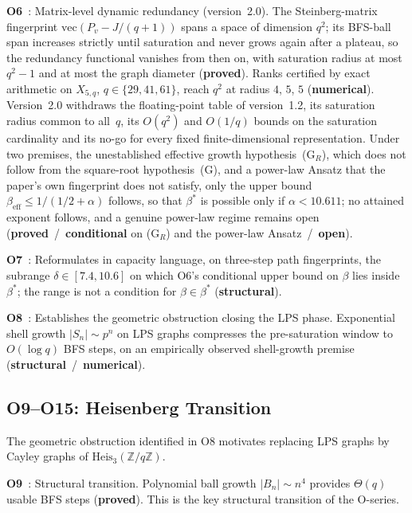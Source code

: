 \documentclass[11pt,a4paper]{article}
\newcommand{\Heis}{\mathrm{Heis}}
\newcommand{\sproved}{\textcolor{cproved}{\textbf{proved}}}
\newcommand{\sstruct}{\textcolor{cstruct}{\textbf{structural}}}
\newcommand{\sopen}{\textcolor{copen}{\textbf{open}}}
\newcommand{\snum}{\textcolor{cnum}{\textbf{numerical}}}
\newcommand{\scond}{\textcolor{ccond}{\textbf{conditional}}}
\begin{document}
    \textbf{O6}~\cite{Beau2026a10}: Matrix-level dynamic redundancy (version~2.0).
    The Steinberg-matrix fingerprint $\mathrm{vec}(P_v - J/(q+1))$ spans a space of dimension $q^2$; its
    BFS-ball span increases strictly until saturation and never grows again after a plateau, so the
    redundancy functional vanishes from then on, with saturation radius at most $q^2-1$ and at most the
    graph diameter (\sproved).
    Ranks certified by exact arithmetic on $X_{5,q}$, $q \in \{29,41,61\}$, reach $q^2$ at radius $4$,
    $5$, $5$ (\snum).
    Version~2.0 withdraws the floating-point table of version~1.2, its saturation radius common to
    all~$q$, its $O(q^2)$ and $O(1/q)$ bounds on the saturation cardinality and its no-go for every fixed
    finite-dimensional representation.
    Under two premises, the unestablished effective growth hypothesis~(G$_R$), which does
    not follow from the square-root hypothesis~(G), and a power-law Ansatz that the paper's own fingerprint
    does not satisfy, only the upper bound $\beta_{\mathrm{eff}} \le 1/(1/2+\alpha)$ follows, so that
    $\beta^*$ is possible only if $\alpha < 10.611$; no attained exponent follows, and a genuine power-law
    regime remains open
    (\sproved\ /\ \scond{} on (G$_R$) and the power-law Ansatz\ /\ \sopen).

    \textbf{O7}~\cite{Beau2026a11}: Reformulates in capacity language, on three-step path fingerprints,
    the subrange $\delta \in [7.4, 10.6]$ on which O6's conditional upper bound on $\beta$ lies inside
    $\beta^*$; the range is not a condition for $\beta \in \beta^*$ (\sstruct).

    \textbf{O8}~\cite{Beau2026a12}: Establishes the geometric obstruction closing the LPS phase.
    Exponential shell growth $|S_n| \sim p^n$ on LPS graphs compresses the
    pre-saturation window to $O(\log q)$ BFS steps, on an empirically observed shell-growth premise
    (\sstruct\ /\ \snum).

  \subsection{O9--O15: Heisenberg Transition}

    The geometric obstruction identified in O8 motivates replacing LPS graphs by Cayley graphs of
    $\Heis_3(\mathbb{Z}/q\mathbb{Z})$.

    \textbf{O9}~\cite{Beau2026a13}: Structural transition.
    Polynomial ball growth $|B_n| \sim n^4$ provides $\Theta(q)$ usable BFS steps (\sproved).
    This is the key structural transition of the O-series.
\end{document}
